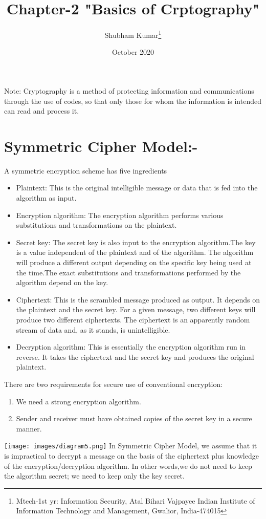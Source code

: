 \documentclass{article}
\title{Chapter-2 "Basics of Crptography"}
\author{Shubham Kumar\thanks{Mtech-1st yr: Information Security, Atal Bihari Vajpayee Indian Institute of Information Technology and Management, Gwalior, India-474015} }
\date{October 2020}
\begin{document}
\maketitle

Note: Cryptography is a method of protecting information and communications through the use of codes, so that only those for whom the information is intended can read and process it.
\\
\section{Symmetric Cipher Model:-}
A symmetric encryption scheme has five ingredients
\begin{itemize}
    \item Plaintext: This is the original intelligible message or data that is fed into the algorithm as input.
    \item Encryption algorithm: The encryption algorithm performs various substitutions and transformations on the plaintext.
    \item Secret key: The secret key is also input to the encryption algorithm.The key is a value independent of the plaintext and of the algorithm. The algorithm will produce a different output depending on the specific key being used at the time.The exact substitutions and transformations performed by the algorithm depend on the key.
    \item Ciphertext: This is the scrambled message produced as output. It depends on the plaintext and the secret key. For a given message, two different keys will produce two different ciphertexts. The ciphertext is an apparently random stream of data and, as it stands, is unintelligible.
    \item Decryption algorithm: This is essentially the encryption algorithm run in reverse. It takes the ciphertext and the secret key and produces the original plaintext.
\end{itemize}

There are two requirements for secure use of conventional encryption:
\begin{enumerate}
    \item We need a strong encryption algorithm.
    \item Sender and receiver must have obtained copies of the secret key in a secure manner.
\end{enumerate}
\texttt{[image: images/diagram5.png]}
In Symmetric Cipher Model, we assume that it is impractical to decrypt a message on the basis of the ciphertext plus knowledge of the encryption/decryption algorithm. In other words,we do not need to keep the algorithm secret; we need to keep only the key secret.
\end{document}
